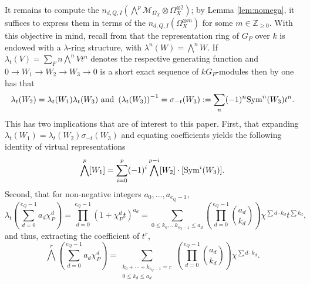 \documentclass[10pt]{amsart}
\theoremstyle{definition}
\begin{document}
It remains to compute the $n_{d,Q,I}(\bigwedge^p\mathcal{M}_{\Omega_X}\otimes \Omega_X^{\otimes 2})$; by Lemma \ref{lem:nomega}, it suffices to express them in terms of the $n_{d,Q,I}(\Omega_X^{\otimes m})$ for some $m\in\mathbb{Z}_{\geq 0}$. With this objective in mind, recall from \cite[23.39]{MR1153249} that the representation ring of $G_P$ over $k$ is endowed with a $\lambda$-ring structure, with $\lambda^n(W)=\bigwedge^nW$. If $\lambda_t(V)=\sum_Fn \bigwedge^n V t^n$ denotes the respective generating function and $0\rightarrow W_1\rightarrow W_2\rightarrow W_3\rightarrow 0$ is a short exact sequence of $kG_P$-modules then by \cite[12.5]{MR1038525} one has that
\[
\lambda_t(W_2)=\lambda_t({W_1})\lambda_t(W_3)\text{ and }
\left(\lambda_t(W_3)\right)^{-1}=\sigma_{-t}(W_3):=\sum_n(-1)^n{\rm Sym}^n(W_3)t^n.
\]
This has two implications that are of interest to this paper. First, that expanding $\lambda_{t}(W_1)=\lambda_t(W_2)\sigma_{-t}(W_3)$ and equating coefficients yields the following identity of virtual representations
\begin{equation}\label{eq:binomial1}
\bigwedge^p [W_1]= \sum_{i=0}^p (-1)^{i}\bigwedge^{p-i}[W_2]\cdot [{\rm Sym}^i(W_3)].
\end{equation}
Second, that for non-negative integers $a_0,\ldots,a_{e_Q-1}$,
\[
\lambda_t\left(\sum_{d=0}^{e_Q-1}a_d\chi_P^d\right)
=\prod_{d=0}^{e_Q-1}(1+\chi_P^d t)^{a_d}
=\sum_{0\leq k_0,\ldots k_{e_Q-1}\leq a_d}
\left(\prod_{d=0}^{e_Q-1} \binom{a_d}{k_d}\right) \chi^{\sum d\cdot k_d} t^{\sum k_d},
\]
and thus, extracting the coefficient of $t^r$,
\begin{equation}\label{eq:multinomial}
\bigwedge^{r}\left(\sum_{d=0}^{e_Q-1}a_d\chi_P^d\right)
=\sum_{\substack{k_0+\cdots+k_{e_Q-1}=r \\0\leq k_d\leq a_d}}
\left(\prod_{d=0}^{e_Q-1} \binom{a_d}{k_d}\right) \chi^{\sum d\cdot k_d}.
\end{equation}
\end{document}
